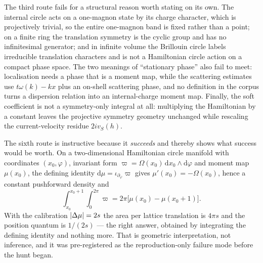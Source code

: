 The third route fails for a structural reason worth stating on its own. The
internal circle acts on a one-magnon state by its charge character, which is
projectively trivial, so the entire one-magnon band is fixed rather than a
point; on a finite ring the translation symmetry is the cyclic group and has
no infinitesimal generator; and in infinite volume the Brillouin circle labels
irreducible translation characters and is not a Hamiltonian circle action on a
compact phase space. The two meanings of ``stationary phase'' also fail to
meet: localisation needs a phase that is a moment map, while the scattering
estimates use $t\omega(k) - kx$ plus an on-shell scattering phase, and no
definition in the corpus turns a dispersion relation into an internal-charge
moment map. Finally, the soft coefficient is not a symmetry-only integral at
all: multiplying the Hamiltonian by a constant leaves the projective symmetry
geometry unchanged while rescaling the current-velocity residue $2iv_S(h)$.

The sixth route is instructive because it \emph{succeeds} and thereby shows
what success would be worth. On a two-dimensional Hamiltonian circle manifold
with coordinates $(x_0,\varphi)$, invariant form $\varpi = \Omega(x_0)\,
\mathrm{d}x_0 \wedge \mathrm{d}\varphi$ and moment map $\mu(x_0)$, the defining
identity $\mathrm{d}\mu = \iota_{\partial_\varphi}\varpi$ gives
$\mu'(x_0) = -\Omega(x_0)$, hence a constant pushforward density and
\begin{equation}
  \int_{x_0}^{x_0+1}\!\!\int_0^{2\pi} \varpi
  = 2\pi\bigl[\mu(x_0) - \mu(x_0+1)\bigr] .
\end{equation}
With the calibration $\lvert \Delta\mu\rvert = 2s$ the area per lattice translation is
$4\pi s$ and the position quantum is $1/(2s)$ — the right answer, obtained by
integrating the defining identity and nothing more. That is geometric
interpretation, not inference, and it was pre-registered as the
reproduction-only failure mode before the hunt began.

